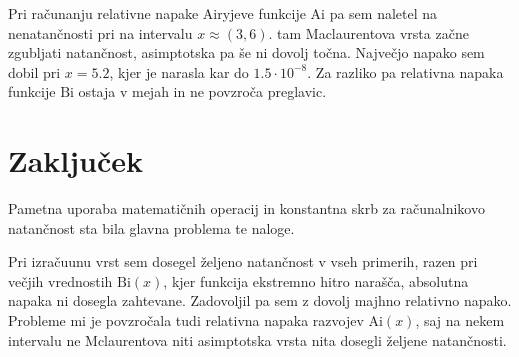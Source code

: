 \documentclass[a4paper, 12pt, slovene]{article}
\newcommand{\Ai}{\mathrm{Ai}}
\newcommand{\Bi}{\mathrm{Bi}}
\begin{document}
Pri računanju relativne napake Airyjeve funkcije $\Ai$ pa sem naletel na nenatančnosti pri na intervalu $x \approx (3, 6)$. tam Maclaurentova vrsta začne zgubljati natančnost, asimptotska pa še ni dovolj točna. Največjo napako sem dobil pri $x = 5.2$, kjer je narasla kar do $1.5\cdot10^{-8}$. Za razliko pa relativna napaka funkcije $\Bi$ ostaja v mejah in ne povzroča preglavic.


\section{Zaključek}
Pametna uporaba matematičnih operacij in konstantna skrb za računalnikovo natančnost sta bila glavna problema te naloge. \par\vspace{5mm}

Pri izračuunu vrst sem dosegel željeno natančnost v vseh primerih, razen pri večjih vrednostih $\Bi(x)$, kjer funkcija ekstremno hitro narašča, absolutna napaka ni dosegla zahtevane. Zadovoljil pa sem z dovolj majhno relativno napako. Probleme mi je povzročala tudi relativna napaka razvojev $\Ai(x)$, saj na nekem intervalu ne Mclaurentova niti asimptotska vrsta nita dosegli željene natančnosti.
\end{document}
